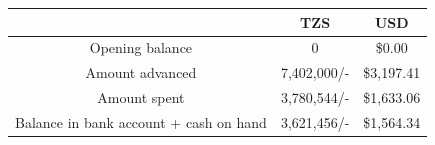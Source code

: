 \documentclass[a4paper,12pt,twoside]{article}
\begin{document}
\begin{center}
\begin{tabular}{|c|c|c|}
\hline
 & TZS & USD \\
 \hline
 \rowcolor{Gray}
Opening balance & 0 & \$0.00 \\

Amount advanced & 7,402,000/- & \$3,197.41 \\

\rowcolor{Gray}
Amount spent & 3,780,544/- & \$1,633.06 \\

Balance in bank account + cash on hand & 3,621,456/- & \$1,564.34 \\
 \hline
\end{tabular}
\end{center}
\end{document}
